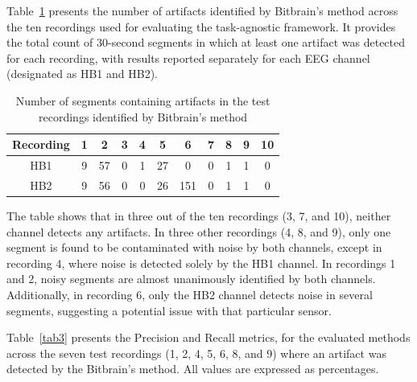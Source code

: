 Table~\ref{tab2} presents the number of artifacts identified by Bitbrain’s method across the ten recordings used for evaluating the task-agnostic framework. It provides the total count of 30-second segments in which at least one artifact was detected for each recording, with results reported separately for each EEG channel (designated as HB1 and HB2).

\begin{table}[htbp]
\caption{Number of segments containing artifacts in the test recordings identified by Bitbrain’s method}
    \centering
    \renewcommand{\arraystretch}{1.3} %
    \begin{tabular}{|c|c|c|c|c|c|c|c|c|c|c|}
        \hline
        \textbf{Recording} & \textbf{1} & \textbf{2} & \textbf{3} & \textbf{4} & \textbf{5} & \textbf{6} & \textbf{7} & \textbf{8} & \textbf{9} & \textbf{10} \\
        \hline
        HB1 & 9 & 57 & 0 & 1 & 27 & 0 & 0 & 1 & 1 & 0 \\
        \hline
        HB2 & 9 & 56 & 0 & 0 & 26 & 151 & 0 & 1 & 1 & 0 \\
        \hline
    \end{tabular}
    \label{tab2}
\end{table}

The table shows that in three out of the ten recordings (3, 7, and 10), neither channel detects any artifacts. In three other recordings (4, 8, and 9), only one segment is found to be contaminated with noise by both channels, except in recording 4, where noise is detected solely by the HB1 channel. In recordings 1 and 2, noisy segments are almost unanimously identified by both channels. Additionally, in recording 6, only the HB2 channel detects noise in several segments, suggesting a potential issue with that particular sensor.

Table~\ref{tab3} presents the Precision and Recall metrics, for the evaluated methods across the seven test recordings (1, 2, 4, 5, 6, 8, and 9) where an artifact was detected by the Bitbrain's method. All values are expressed as percentages.

